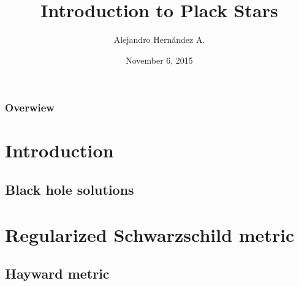 \documentclass{beamer}
\title[Planck Stars]{Introduction to Plack Stars} %
\author[Hernández A.]{Alejandro Hernández A. } %
\institute[Uniandes] %
{
Universidad de los Andes, Bogotá, Colombia \\ %
}
\date{November 6, 2015} %
\begin{document}
\begin{frame}
\titlepage %
\end{frame}

\begin{frame}
\frametitle{Overwiew} %
\tableofcontents %
\end{frame}


\section{Introduction} %


\subsection{Black hole solutions}

\section{Regularized Schwarzschild metric}

\subsection{Hayward metric}
\end{document}
